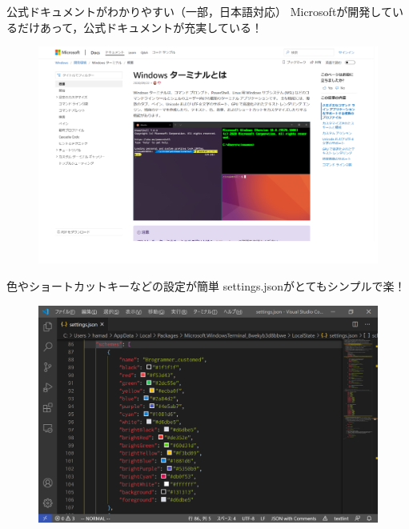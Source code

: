 \documentclass[dvipsnames,usenames,aspectratio=169,12pt]{beamer}
\begin{document}
\begin{frame}{公式ドキュメントがわかりやすい（一部，日本語対応）}
Microsoftが開発しているだけあって，公式ドキュメントが充実している！

\begin{figure}[h]
\centering
\includegraphics[scale=0.22]{./fig/docs.png}
\end{figure}
\end{frame}

\begin{frame}{色やショートカットキーなどの設定が簡単}
settings.jsonがとてもシンプルで楽！
\begin{figure}[h]
\centering
\includegraphics[scale=0.22]{./fig/color.png}
\end{figure}
\end{frame}
\end{document}
